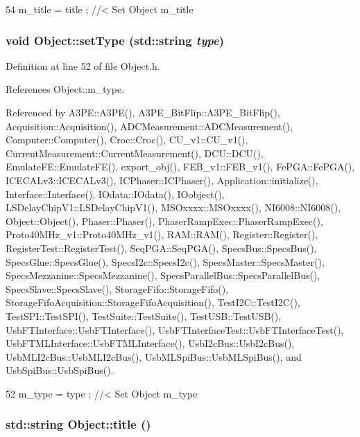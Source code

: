 \begin{DoxyCode}
54 { m_title = title ; } //< Set Object m_title
\end{DoxyCode}
\hypertarget{classObject_aae534cc9d982bcb9b99fd505f2e103a5}{
\subsubsection[{setType}]{\setlength{\rightskip}{0pt plus 5cm}void Object::setType (std::string {\em type})}}
\label{classObject_aae534cc9d982bcb9b99fd505f2e103a5}


Definition at line 52 of file Object.h.

References Object::m\_\-type.

Referenced by A3PE::A3PE(), A3PE\_\-BitFlip::A3PE\_\-BitFlip(), Acquisition::Acquisition(), ADCMeasurement::ADCMeasurement(), Computer::Computer(), Croc::Croc(), CU\_\-v1::CU\_\-v1(), CurrentMeasurement::CurrentMeasurement(), DCU::DCU(), EmulateFE::EmulateFE(), export\_\-obj(), FEB\_\-v1::FEB\_\-v1(), FePGA::FePGA(), ICECALv3::ICECALv3(), ICPhaser::ICPhaser(), Application::initialize(), Interface::Interface(), IOdata::IOdata(), IOobject(), LSDelayChipV1::LSDelayChipV1(), MSOxxxx::MSOxxxx(), NI6008::NI6008(), Object::Object(), Phaser::Phaser(), PhaserRampExec::PhaserRampExec(), Proto40MHz\_\-v1::Proto40MHz\_\-v1(), RAM::RAM(), Register::Register(), RegisterTest::RegisterTest(), SeqPGA::SeqPGA(), SpecsBus::SpecsBus(), SpecsGlue::SpecsGlue(), SpecsI2c::SpecsI2c(), SpecsMaster::SpecsMaster(), SpecsMezzanine::SpecsMezzanine(), SpecsParallelBus::SpecsParallelBus(), SpecsSlave::SpecsSlave(), StorageFifo::StorageFifo(), StorageFifoAcquisition::StorageFifoAcquisition(), TestI2C::TestI2C(), TestSPI::TestSPI(), TestSuite::TestSuite(), TestUSB::TestUSB(), UsbFTInterface::UsbFTInterface(), UsbFTInterfaceTest::UsbFTInterfaceTest(), UsbFTMLInterface::UsbFTMLInterface(), UsbI2cBus::UsbI2cBus(), UsbMLI2cBus::UsbMLI2cBus(), UsbMLSpiBus::UsbMLSpiBus(), and UsbSpiBus::UsbSpiBus().


\begin{DoxyCode}
52 { m_type  = type  ; } //< Set Object m_type
\end{DoxyCode}
\hypertarget{classObject_a73a0f1a41828fdd8303dd662446fb6c3}{
\subsubsection[{title}]{\setlength{\rightskip}{0pt plus 5cm}std::string Object::title ()}}
\label{classObject_a73a0f1a41828fdd8303dd662446fb6c3}


